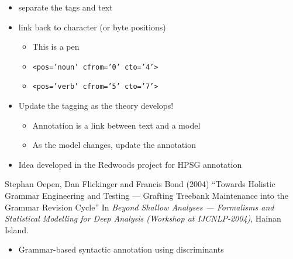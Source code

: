 \documentclass[a4paper,landscape,headrule,footrule,xetex]{foils}
\begin{document}



\begin{itemize}
\item separate the tags and text
\item link back to character (or byte positions)
  \begin{itemize}
  \item This is a pen
  \item \texttt{<pos='noun' cfrom='0'  cto='4'>}
  \item \texttt{<pos='verb' cfrom='5'  cto='7'>}
    
  \end{itemize}
\end{itemize}


\begin{itemize}
\item Update the tagging as the theory develops!
  \begin{itemize}
  \item Annotation is a link between text and a model
  \item As the model changes, update the annotation
  \end{itemize}
\item Idea developed in the Redwoods project for HPSG annotation
\end{itemize}

Stephan Oepen, Dan Flickinger and Francis Bond (2004)
     ``Towards Holistic Grammar Engineering and Testing --- Grafting Treebank Maintenance into the Grammar Revision Cycle'' In \textit{Beyond Shallow Analyses --- Formalisms and Statistical Modelling for Deep Analysis (Workshop at IJCNLP-2004)}, Hainan Island. 



\begin{itemize}
\item Grammar-based syntactic annotation using discriminants
\end{itemize}
\end{document}

